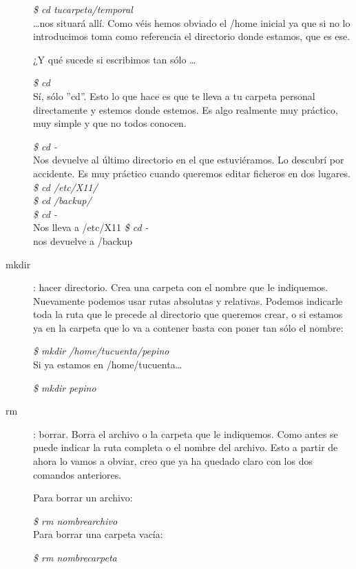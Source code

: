 \documentclass[12pt,spanish,lettersize,twocolumn]{article}
\begin{document}
\begin{description}
\emph{\$ cd tucarpeta/temporal}\\

\ldots nos situar\'a all\'i. Como v\'eis hemos obviado el /home inicial ya que si no lo introducimos toma como referencia el directorio donde estamos, que es ese.

¿Y qu\'e sucede si escribimos tan s\'olo \ldots

\emph{\$ cd}\\

S\'i, s\'olo ''cd''. Esto lo que hace es que te lleva a tu carpeta personal directamente y estemos donde estemos. Es algo realmente muy pr\'actico, muy simple y que no todos conocen.

\emph{\$ cd -}\\
Nos devuelve al último directorio en el que estuvi\'eramos. Lo descubr\'i por accidente.
Es muy pr\'actico cuando queremos editar ficheros en dos lugares.
\emph{\$ cd /etc/X11/}\\
\emph{\$ cd /backup/}\\
\emph{\$ cd -}\\
Nos lleva a /etc/X11
\emph{\$ cd -}\\
nos devuelve a /backup

\item[mkdir]: hacer directorio. Crea una carpeta con el nombre que le indiquemos. Nuevamente podemos usar rutas absolutas y relativas. Podemos indicarle toda la ruta que le precede al directorio que queremos crear, o si estamos ya en la carpeta que lo va a contener basta con poner tan s\'olo el nombre:

\emph{\$ mkdir /home/tucuenta/pepino}\\

Si ya estamos en /home/tucuenta\ldots

\emph{\$ mkdir pepino}\\

\item[rm]: borrar. Borra el archivo o la carpeta que le indiquemos. Como antes se puede indicar la ruta completa o el nombre del archivo. Esto a partir de ahora lo vamos a obviar, creo que ya ha quedado claro con los dos comandos anteriores.

Para borrar un archivo:

\emph{\$ rm nombrearchivo}\\

Para borrar una carpeta vac\'ia:

\emph{\$ rm nombrecarpeta}\\


\end{description}
\end{document}

